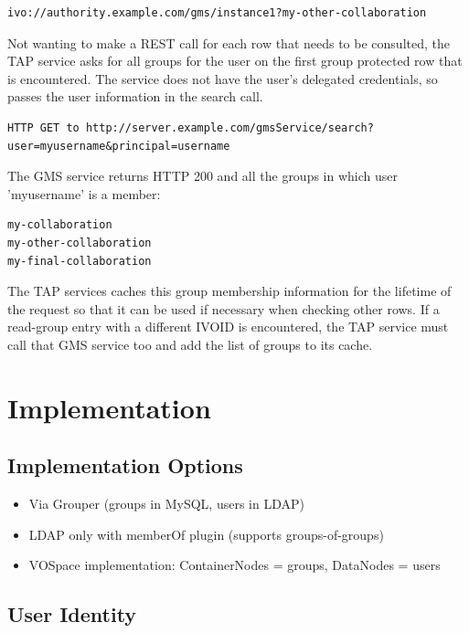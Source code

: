\documentclass[11pt,a4paper]{ivoa}
\begin{document}
\begin{verbatim}
ivo://authority.example.com/gms/instance1?my-other-collaboration
\end{verbatim}

Not wanting to make a REST call for each row that needs to be consulted, the TAP service asks for all groups for the user on the first group protected row that is encountered.  The service does not have the user's delegated credentials, so passes the user information in the search call.

\begin{verbatim}
HTTP GET to http://server.example.com/gmsService/search?user=myusername&principal=username
\end{verbatim}

The GMS service returns HTTP 200 and all the groups in which user 'myusername' is a member:

\begin{verbatim}
my-collaboration
my-other-collaboration
my-final-collaboration
\end{verbatim}

The TAP services caches this group membership information for the lifetime of the request so that it can be used if necessary when checking other rows.  If a read-group entry with a different IVOID is encountered, the TAP service must call that GMS service too and add the list of groups to its cache.

\section {Implementation}

\subsection {Implementation Options}

\begin{itemize}
\item Via Grouper (groups in MySQL, users in LDAP)
\item LDAP only with memberOf plugin (supports groups-of-groups)
\item VOSpace implementation: ContainerNodes = groups, DataNodes = users
\end{itemize}

\subsection{User Identity}
\end{document}
